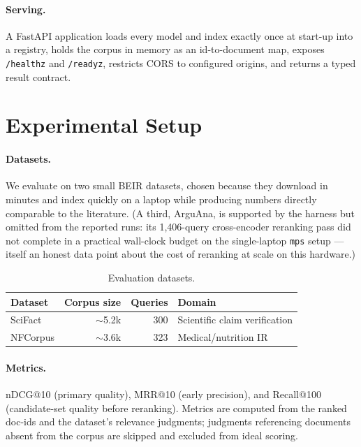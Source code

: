 \documentclass[11pt]{article}
\begin{document}
\paragraph{Serving.} A FastAPI application loads every model and index exactly
once at start-up into a registry, holds the corpus in memory as an id-to-document
map, exposes \texttt{/healthz} and \texttt{/readyz}, restricts CORS to configured
origins, and returns a typed result contract.

\section{Experimental Setup}
\label{sec:setup}

\paragraph{Datasets.} We evaluate on two small BEIR datasets, chosen because
they download in minutes and index quickly on a laptop while producing numbers
directly comparable to the literature. (A third, ArguAna, is supported by the
harness but omitted from the reported runs: its 1{,}406-query cross-encoder
reranking pass did not complete in a practical wall-clock budget on the
single-laptop \texttt{mps} setup --- itself an honest data point about the cost of
reranking at scale on this hardware.)

\begin{table}[h]
  \centering
  \caption{Evaluation datasets.}
  \label{tab:datasets}
  \begin{tabular}{lrrl}
    \toprule
    Dataset & Corpus size & Queries & Domain \\
    \midrule
    SciFact  & $\sim$5.2k  & 300   & Scientific claim verification \\
    NFCorpus & $\sim$3.6k  & 323   & Medical/nutrition IR \\
    \bottomrule
  \end{tabular}
\end{table}

\paragraph{Metrics.} nDCG@10 (primary quality), MRR@10 (early precision), and
Recall@100 (candidate-set quality before reranking). Metrics are computed from the
ranked doc-ids and the dataset's relevance judgments; judgments referencing
documents absent from the corpus are skipped and excluded from ideal scoring.
\end{document}
